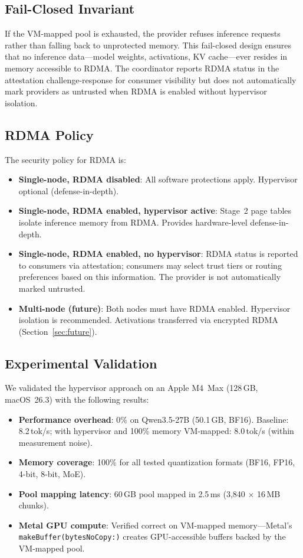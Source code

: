 \documentclass[10pt,twocolumn,letterpaper]{article}
\begin{document}
\subsection{Fail-Closed Invariant}

If the VM-mapped pool is exhausted, the provider refuses inference requests rather than falling back to unprotected memory. This fail-closed design ensures that no inference data---model weights, activations, KV cache---ever resides in memory accessible to RDMA. The coordinator reports RDMA status in the attestation challenge-response for consumer visibility but does not automatically mark providers as untrusted when RDMA is enabled without hypervisor isolation.

\subsection{RDMA Policy}

The security policy for RDMA is:
\begin{itemize}[leftmargin=*,itemsep=1pt]
    \item \textbf{Single-node, RDMA disabled}: All software protections apply. Hypervisor optional (defense-in-depth).
    \item \textbf{Single-node, RDMA enabled, hypervisor active}: Stage~2 page tables isolate inference memory from RDMA. Provides hardware-level defense-in-depth.
    \item \textbf{Single-node, RDMA enabled, no hypervisor}: RDMA status is reported to consumers via attestation; consumers may select trust tiers or routing preferences based on this information. The provider is not automatically marked untrusted.
    \item \textbf{Multi-node (future)}: Both nodes must have RDMA enabled. Hypervisor isolation is recommended. Activations transferred via encrypted RDMA (Section~\ref{sec:future}).
\end{itemize}

\subsection{Experimental Validation}

We validated the hypervisor approach on an Apple M4~Max (128\,GB, macOS~26.3) with the following results:
\begin{itemize}[leftmargin=*,itemsep=1pt]
    \item \textbf{Performance overhead}: 0\% on Qwen3.5-27B (50.1\,GB, BF16). Baseline: 8.2\,tok/s; with hypervisor and 100\% memory VM-mapped: 8.0\,tok/s (within measurement noise).
    \item \textbf{Memory coverage}: 100\% for all tested quantization formats (BF16, FP16, 4-bit, 8-bit, MoE).
    \item \textbf{Pool mapping latency}: 60\,GB pool mapped in 2.5\,ms (3,840 $\times$ 16\,MB chunks).
    \item \textbf{Metal GPU compute}: Verified correct on VM-mapped memory---Metal's \texttt{makeBuffer(bytesNoCopy:)} creates GPU-accessible buffers backed by the VM-mapped pool.
\end{itemize}
\end{document}

